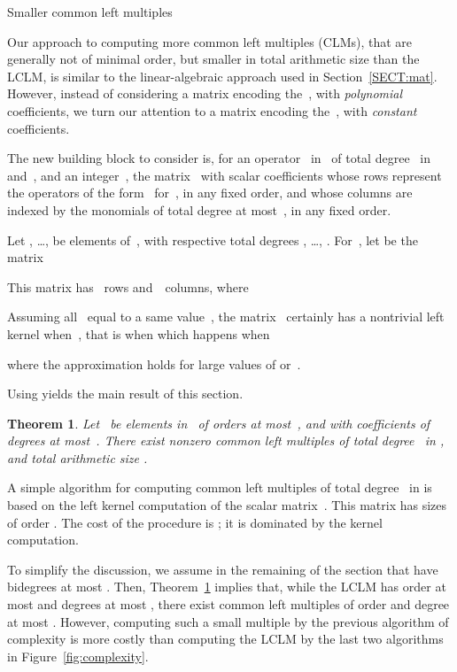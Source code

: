 \documentclass{sig-alt-full}
\newtheorem{theorem}{Theorem}
\begin{document}
\begin{section}{\!\!\!\! Smaller common left multiples}

Our approach to computing more common left multiples (CLMs), that are generally
not of minimal order, but smaller in total arithmetic size than the LCLM, is
similar to the linear-algebraic approach used in Section~\ref{SECT:mat}.
However, instead of considering a matrix encoding the~, with
\emph{polynomial\/} coefficients, we turn our attention to a matrix encoding
the~, with \emph{constant\/} coefficients.

\medskip {} The new building block to consider is, for an operator~ in~ of total degree~ in  and~, and
an integer~, the 
matrix~ with scalar coefficients whose rows represent the operators
of the form~ for~, in any fixed
order, and whose columns are indexed by the monomials of total degree at
most~, in any fixed order.

Let , \dots,  be elements of~,  with respective total degrees , \dots, .
For~, let  be the matrix
\vspace{-0.3cm}

This matrix has ~rows and~~columns, where


Assuming all~ equal to a same value~, the matrix~ certainly has a nontrivial left kernel when~, that is when 
which happens when

where the approximation holds for large values of  or~.

\smallskip Using   yields the main result of this section.

\vspace{-0.3cm}
\begin{theorem} \label{th:CLM}
Let~ be elements in~ of orders at most~, and with coefficients of degrees at most~.
There exist nonzero common left multiples of total degree~ in
, and total arithmetic size .
\end{theorem}

\vspace{-0.3cm}
\medskip {} A simple algorithm for computing  common left multiples of total degree~ in  is  based on the left kernel
computation of the scalar matrix~. This matrix has sizes of order . The cost of the procedure is ; it is dominated by the kernel computation.

\smallskip To simplify the discussion, we assume in the remaining of the
section that  have bidegrees at most . 
Then, Theorem~\ref{th:CLM} implies that, while the LCLM has
order at most  and degrees at most , there exist common left
multiples of order and degree at most .
However, computing such a small multiple by the previous algorithm of
complexity  is more costly than computing the
LCLM by the last two algorithms in Figure~\ref{fig:complexity}. 


\end{section}
\end{document}

